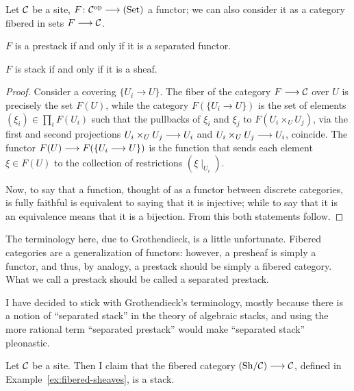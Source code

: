 \begin{4   STACKS}
\begin{4.1 Descent of objects of fibcats}
\begin{proposition}
Let $\mathcal{C}$ be a site, $F \colon \cC\op \arr \catset$ a functor; we can also consider it as a category fibered in sets $F \arr \cC$.

\begin{enumeratei}

\item $F$ is a prestack if and only if it is a separated functor.

\item $F$ is stack if and only if it is a sheaf.

\end{enumeratei}
\end{proposition}

\begin{proof}
Consider a covering $\{U_i \to U\}$. The fiber of the category $F \arr \cC $ over $U$ is precisely the set $F(U)$, while the category $F(\{U_i \to U\})$ is the set of elements $(\xi_i) \in \prod_iF(U_i)$ such that the pullbacks of $\xi_i$ and  $\xi_j$ to $F(U_i \times_U U_j)$, via the first and second projections $U_i \times_U U_j \arr U_i$ and $U_i \times_U U_j \arr U_i$, coincide. The functor $F(U) \arr F(\{U_i \to U\})$ is the function that sends each element $\xi\in F(U)$ to the collection of restrictions $(\xi\mid_{U_i})$.

Now, to say that a function, thought of as a functor between discrete categories, is fully faithful is equivalent to saying that it is injective; while to say that it is an equivalence means that it is a bijection. From this both statements follow.
\end{proof}


\begin{remark}
The terminology here, due to Grothendieck, is a little unfortunate. Fibered categories are a generalization of functors: however, a presheaf is simply a functor, and thus, by analogy, a prestack should be simply a fibered category. What we call a prestack should be called a separated prestack.

I have decided to stick with Grothendieck's terminology, mostly because there is a notion of ``separated stack'' in the theory of algebraic stacks, and using the more rational term ``separated prestack'' would make ``separated stack'' pleonastic.
\end{remark}



\begin{example}
Let $\mathcal{C}$ be a site. Then I claim that the fibered category $\catsh{\cC} \arr \cC$, defined in Example~\ref{ex:fibered-sheaves}, is a stack.


\end{example}
\end{4.1 Descent of objects of fibcats}
\end{4   STACKS}
